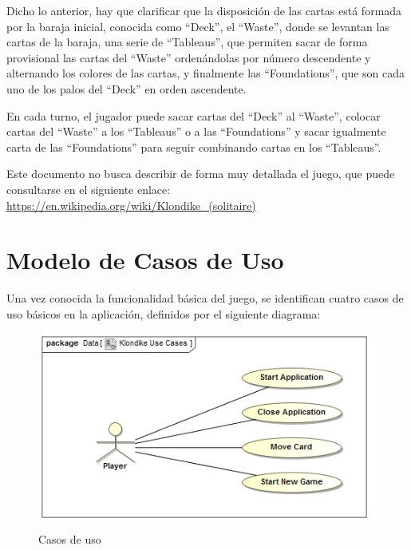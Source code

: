 \documentclass[11pt]{article}
\begin{document}
Dicho lo anterior, hay que clarificar que la disposición de las cartas está formada por la baraja inicial, conocida como ``Deck'', el ``Waste'', donde se levantan las cartas de la baraja, una serie de ``Tableaus'', que permiten sacar de forma provisional las cartas del ``Waste'' ordenándolas por número descendente y alternando los colores de las cartas, y finalmente las ``Foundations'', que son cada uno de los palos del ``Deck'' en orden ascendente.

En cada turno, el jugador puede sacar cartas del ``Deck'' al ``Waste'', colocar cartas del ``Waste'' a los ``Tableaus'' o a las ``Foundations'' y sacar igualmente carta de las ``Foundations'' para seguir combinando cartas en los ``Tableaus''.

Este documento no busca describir de forma muy detallada el juego, que puede consultarse en el siguiente enlace: \url{https://en.wikipedia.org/wiki/Klondike_(solitaire)}


\pagebreak

\section{Modelo de Casos de Uso}

Una vez conocida la funcionalidad básica del juego, se identifican cuatro casos de uso básicos en la aplicación, definidos por el siguiente diagrama:

\begin{center}
 \begin{figure}[H]
 \begin{center}
   \includegraphics[width=15cm]{DomainModel/KlondikeUseCases00.jpg}
   \caption{Casos de uso}
   \label{fig:usecases}
 \end{center}
 \end{figure}
\end{center}
\end{document}
